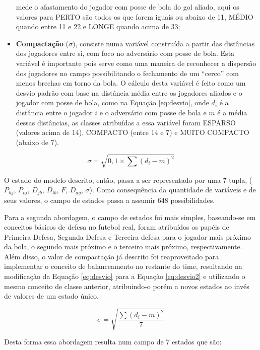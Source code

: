 \begin{itemize}
    mede o afastamento do jogador com posse de bola do gol aliado, aqui os
    valores para PERTO são todos os que forem iguais ou abaixo de 11, MÉDIO
    quando entre 11 e 22 e LONGE quando acima de 33;
    \item \textbf{Compactação} ($\sigma$), consiste numa variável construída a
    partir das distâncias dos jogadores entre si, com foco no adversário com
    posse de bola. Esta variável é importante pois serve como uma maneira de
    reconhecer a dispersão dos jogadores no campo possibilitando o fechamento de
    um ``cerco'' com menos brechas em torno da bola. O cálculo desta variável é
    feito como um desvio padrão com base na distância média entre os jogadores
    aliados e o jogador com posse de bola, como na Equação \ref{eq:desvio}, onde
    $d_i$ é a distância entre o jogador $i$ e o adversário com posse de bola e
    $m$ é a média dessas distâncias, as classes atribuídas a essa variável foram
    ESPARSO (valores acima de 14), COMPACTO (entre 14 e 7) e MUITO COMPACTO
    (abaixo de 7).
\end{itemize}

\begin{equation}
    \sigma=\sqrt{0,1\times \sum{(d_i - m)^2}}
    \label{eq:desvio}
\end{equation}

O estado do modelo descrito, então, passa a ser representado por uma 7-tupla,
($P_{hj}$, $P_{vj}$, $D_{jb}$, $D_{tb}$, $F$, $D_{ag}$, $\sigma$). Como
consequência da quantidade de variáveis e de seus valores, o campo de estados
passa a assumir 648 possibilidades.

Para a segunda abordagem, o campo de estados foi mais simples, baseando-se em
conceitos básicos de defesa no futebol real, foram atribuídos os papéis de
Primeira Defesa, Segunda Defesa e Terceira defesa para o jogador mais próximo da
bola, o segundo mais próximo e o terceiro mais próximo, respectivamente. Além
disso, o valor de compactação já descrito foi reaproveitado para implementar o
conceito de balanceamento no restante do time, resultando na modificação da
Equação \ref{eq:desvio} para a Equação \ref{eq:desvio2} e utilizando o mesmo
conceito de classe anterior, atribuindo-o porém a novos estados ao invés de
valores de um estado único.

\begin{equation}
    \sigma=\sqrt{\frac{\sum{(d_i - m)^2}}{7}}
    \label{eq:desvio2}
\end{equation}

Desta forma essa abordagem resulta num campo de 7 estados que são:

